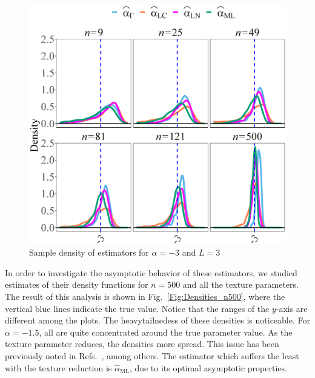 \documentclass[twocolumn]{svjour3}
\begin{document}
\begin{figure}[hbt]
\centering
\includegraphics[width=1\linewidth]{../Figures/DensidadEstimadorNoCont}
\caption{\label{Fig:DistributionL=3_alfa=-3} Sample density of estimators for $\alpha=-3$ and  $L=3$ }\label{Fig:DistEstimator}
\end{figure}

In order to investigate the asymptotic behavior of these estimators, we studied estimates of their density functions for $n=500$ and all the texture parameters. 
The result of this analysis is shown in Fig.~\ref{Fig:Densities_n500}, where
the vertical blue lines indicate the true value. 
Notice that the ranges of the $y$-axis are different among the plots. 
The heavytailnedess of these densities is noticeable.
For $\alpha=-1.5$, all are quite concentrated around the true parameter value. 
As the texture parameter reduces, the densities more spread.
This issue has been previously noted in Refs.~\cite{APSAR2013ParameterEstimationStochasticDistances,CribariFrerySilva:CSDA,AllendeFreryetal:JSCS:05,FreryCribariSouza:JASP:04}, among others.
The estimator which suffers the least with the texture reduction is $\widehat{\alpha}_{\text{{ML}}}$, due to its optimal asymptotic properties.      
\end{document}

